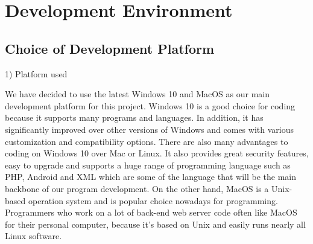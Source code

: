 \documentclass[conference]{IEEEtran}
\begin{document}
\section{Development Environment}
\subsection{Choice of Development Platform\\}

1) Platform used\\

\par We have decided to use the latest Windows 10 and MacOS as our main development platform for this project. Windows 10 is a good choice for coding because it supports many programs and languages. In addition, it has significantly improved over other versions of Windows and comes with various customization and compatibility options. There are also many advantages to coding on Windows 10 over Mac or Linux. It also provides great security features, easy to upgrade and supports a huge range of programming language such as PHP, Android and XML which are some of the language that will be the main backbone of our program development. On the other hand, MacOS is a Unix-based operation system and is popular choice nowadays for programming.  Programmers who work on a lot of back-end web server code often like MacOS for their personal computer, because it's based on Unix and easily runs nearly all Linux software.\\
\end{document}
